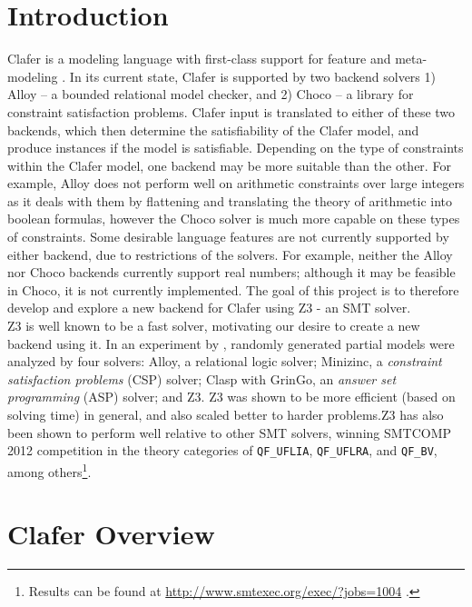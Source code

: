 \documentclass{article}
\begin{document}
\section{Introduction}
Clafer is a modeling language with first-class support for feature and meta-modeling \cite{BakClaferSLE2010}. In its current state, Clafer is supported by two backend solvers 1) Alloy -- a bounded relational model checker, and 2) Choco -- a library for constraint satisfaction problems. Clafer input is translated to either of these two backends, which then determine the satisfiability of the Clafer model, and produce instances if the model is satisfiable. Depending on the type of constraints within the Clafer model, one backend may be more suitable than the other. For example, Alloy does not perform well on arithmetic constraints over large integers as it deals with them by flattening and translating the theory of arithmetic into boolean formulas, however the Choco solver is much more capable on these types of constraints. Some desirable language features are not currently supported by either backend, due to restrictions of the solvers. For example, neither the Alloy nor Choco backends currently support real numbers; although it may be feasible in Choco, it is not currently implemented. The goal of this project is to therefore develop and explore a new backend for Clafer using Z3 - an SMT solver. \\
\indent Z3 is well known to be a fast solver, motivating our desire to create a new backend using it. In an experiment by \cite{Saadatpanah2012}, randomly generated partial models were analyzed by four solvers: Alloy, a relational logic solver; Minizinc, a  \textit{constraint satisfaction problems} (CSP) solver; Clasp with GrinGo, an \textit{answer set programming} (ASP) solver; and Z3. Z3 was shown to be more efficient (based on solving time) in general, and also scaled better to harder problems.Z3 has also been shown to perform well relative to other SMT solvers, winning SMTCOMP 2012 competition in the theory categories of \texttt{QF\_UFLIA}, \texttt{QF\_UFLRA}, and \texttt{QF\_BV}, among others\footnote{Results can be found at \url{http://www.smtexec.org/exec/?jobs=1004} .}.

\section{Clafer Overview}
\end{document}
